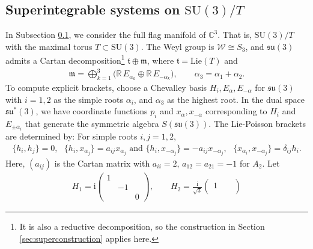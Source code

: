 \documentclass[11pt]{amsart}
\theoremstyle{definition}
\theoremstyle{plain}
\theoremstyle{conclusion}
\begin{document}
\subsection{Superintegrable systems on \texorpdfstring{$\mathrm{SU}(3)/T$}{SU(3)/T}}
\label{subsec:regular}

In Subsection \ref{subsec:regular}, we consider the full flag manifold of $\mathbb{C}^3$. That is, $  \mathrm{SU}(3)/T  $ with the maximal torus $T  \subset \mathrm{SU}(3)$. The Weyl group is $\mathcal{W} \cong S_3$, and $\mathfrak{su}(3)$ admits a Cartan decomposition\footnote{It is also a reductive decomposition, so the construction in Section \ref{sec:superconstruction} applies here.} $\mathfrak{t} \oplus \mathfrak{m}$, where $\mathfrak{t} = \mathrm{Lie}(T)$ and \begin{align*}
\mathfrak{m} = \bigoplus_{k =1}^3\bigl(\mathbb{R}\,E_{\alpha_k}\oplus\mathbb{R}\,E_{-\alpha_k}\bigr),\qquad \alpha_3 =\alpha_1 + \alpha_2.
\end{align*}  To compute explicit brackets, choose a Chevalley basis ${H_i, E_{\alpha}, E_{-\alpha}}$ for $\mathfrak{su} (3)$ with $i=1,2$ as the simple roots $\alpha_i$, and $\alpha_3$ as the highest root. In the dual space $\mathfrak{su}^*(3)$, we have coordinate functions $p_i$ and $x_{\alpha}, x_{-\alpha}$ corresponding to $H_i$ and $E_{\pm \alpha_i}$ that generate the symmetric algebra $S(\mathfrak{su}(3))$.  The Lie-Poisson brackets are determined by: For simple roots $i,j=1,2$, \begin{align*}
    \{h_i,h_j\}=0 , \text{ }  \{h_i,x_{\alpha_j}\} = a_{ij}x_{\alpha_j}  \text{ and }  \{h_i,x_{-\alpha_j}\} = -a_{ij}x_{-\alpha_j}, \text{ } \{x_{\alpha_i},x_{-\alpha_j}\} = \delta_{ij}h_i.
\end{align*}   Here, $(a_{ij})$ is the Cartan matrix with $a_{ii}=2$, $a_{12}=a_{21}=-1$ for $A_2$. Let \begin{align*}
    H_1 =\mathrm{i} \begin{pmatrix} 1& & \\
    &-1& \\ 
    & & 0\end{pmatrix},\qquad  H_2= \frac{\mathrm{i}}{\sqrt3} \begin{pmatrix} 1& & \\

\end{pmatrix}
\end{align*}
\end{document}
